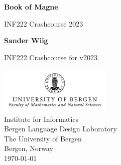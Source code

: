 
\begin{titlepage}
    \begin{center}
        \vspace*{1cm}

        \huge
        \textbf{Book of Magne}

        \vspace{0.5cm}
        \LARGE
        INF222 Crashcourse 2023
            
        \vspace{1.5cm}

        \textbf{Sander Wiig}

        \vfill
        
        \Large
        INF222 Crashcourse for v2023.\\
            
        \vspace{0.5cm}
    
        \includegraphics[width=0.4\textwidth]{assets/UiBlogoMN_gray_m_Eng.png}\\
        \Large
        Institute for Informatics\\
        Bergen Language Design Laboratory\\
        The University of Bergen\\
        Bergen, Norway\\
        \today
            
    \end{center}
\end{titlepage}
\newpage